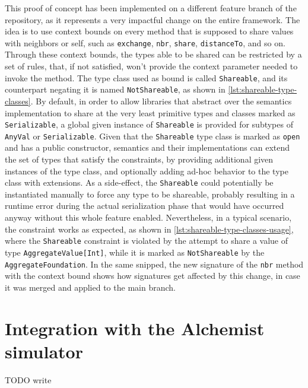 This proof of concept has been implemented on a different feature branch of the repository, as it represents a very impactful change on the entire framework.
%
The idea is to use context bounds on every method that is supposed to share values with neighbors or self, such as \texttt{exchange}, \texttt{nbr}, \texttt{share}, \texttt{distanceTo}, and so on.
%
Through these context bounds, the types able to be shared can be restricted by a set of rules, that, if not satisfied, won't provide the context parameter needed to invoke the method.
%
The type class used as bound is called \texttt{Shareable}, and its counterpart negating it is named \texttt{NotShareable}, as shown in \cref{lst:shareable-type-classes}.
%
By default, in order to allow libraries that abstract over the semantics implementation to share at the very least primitive types and classes marked as \texttt{Serializable}, a global given instance of \texttt{Shareable} is provided for subtypes of \texttt{AnyVal} or \texttt{Serializable}.
%
Given that the \texttt{Shareable} type class is marked as \texttt{open} and has a public constructor, semantics and their implementations can extend the set of types that satisfy the constraints, by providing additional given instances of the type class, and optionally adding ad-hoc behavior to the type class with extensions.
%
As a side-effect, the \texttt{Shareable} could potentially be instantiated manually to force any type to be shareable, probably resulting in a runtime error during the actual serialization phase that would have occurred anyway without this whole feature enabled.
%
Nevertheless, in a typical scenario, the constraint works as expected, as shown in \cref{lst:shareable-type-classes-usage}, where the \texttt{Shareable} constraint is violated by the attempt to share a value of type \texttt{AggregateValue[Int]}, while it is marked as \texttt{NotShareable} by the \texttt{AggregateFoundation}.
%
In the same snipped, the new signature of the \texttt{nbr} method with the context bound shows how signatures get affected by this change, in case it was merged and applied to the main branch.






\section{Integration with the Alchemist simulator}

TODO write
